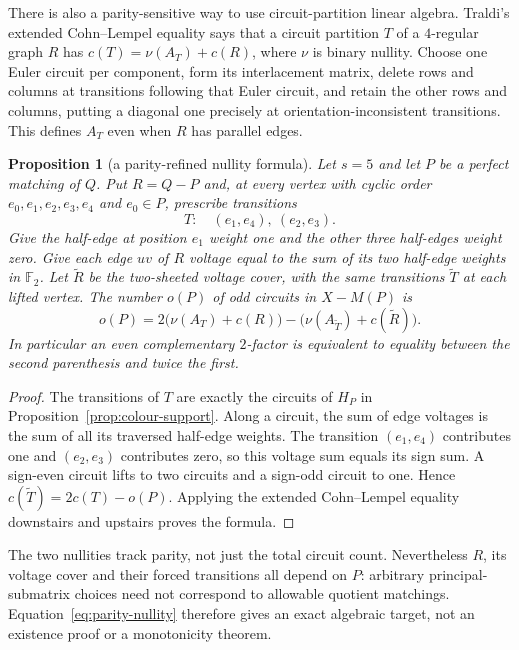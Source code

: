 \documentclass[11pt,a4paper]{article}
\newtheorem{proposition}[theorem]{Proposition}
\theoremstyle{definition}
\theoremstyle{remark}
\begin{document}
There is also a parity-sensitive way to use circuit-partition linear algebra.  Traldi's extended Cohn--Lempel equality \cite[Theorem~4]{Traldi09} says that a circuit partition $T$ of a $4$-regular graph $R$ has $c(T)=\nu(A_T)+c(R)$, where $\nu$ is binary nullity.  Choose one Euler circuit per component, form its interlacement matrix, delete rows and columns at transitions following that Euler circuit, and retain the other rows and columns, putting a diagonal one precisely at orientation-inconsistent transitions.  This defines $A_T$ even when $R$ has parallel edges.
\begin{proposition}[a parity-refined nullity formula]\label{prop:parity-nullity}
Let $s=5$ and let $P$ be a perfect matching of $Q$.  Put $R=Q-P$ and, at every vertex with cyclic order $e_0,e_1,e_2,e_3,e_4$ and $e_0\in P$, prescribe transitions
\[
 T:\quad (e_1,e_4),\ (e_2,e_3).
\]
Give the half-edge at position $e_1$ weight one and the other three half-edges weight zero.  Give each edge $uv$ of $R$ voltage equal to the sum of its two half-edge weights in $\mathbb F_2$.  Let $\widetilde R$ be the two-sheeted voltage cover, with the same transitions $\widetilde T$ at each lifted vertex.  The number $o(P)$ of odd circuits in $X-M(P)$ is
\begin{equation}\label{eq:parity-nullity}
 o(P)=2\bigl(\nu(A_T)+c(R)\bigr)
       -\bigl(\nu(A_{\widetilde T})+c(\widetilde R)\bigr).
\end{equation}
In particular an even complementary $2$-factor is equivalent to equality between the second parenthesis and twice the first.
\end{proposition}
\begin{proof}
The transitions of $T$ are exactly the circuits of $H_P$ in Proposition~\ref{prop:colour-support}.  Along a circuit, the sum of edge voltages is the sum of all its traversed half-edge weights.  The transition $(e_1,e_4)$ contributes one and $(e_2,e_3)$ contributes zero, so this voltage sum equals its sign sum.  A sign-even circuit lifts to two circuits and a sign-odd circuit to one.  Hence $c(\widetilde T)=2c(T)-o(P)$.  Applying the extended Cohn--Lempel equality downstairs and upstairs proves the formula.
\end{proof}

The two nullities track parity, not just the total circuit count.  Nevertheless $R$, its voltage cover and their forced transitions all depend on $P$: arbitrary principal-submatrix choices need not correspond to allowable quotient matchings.  Equation~\eqref{eq:parity-nullity} therefore gives an exact algebraic target, not an existence proof or a monotonicity theorem.
\end{document}
